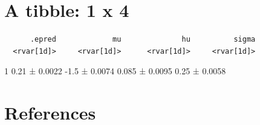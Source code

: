 \documentclass[
]{article}
\begin{document}
\section{A tibble: 1 x 4}\label{a-tibble-1-x-4-1}

\begin{verbatim}
      .epred             mu              hu          sigma
  <rvar[1d]>     <rvar[1d]>      <rvar[1d]>     <rvar[1d]>
\end{verbatim}

1 0.21 ± 0.0022 -1.5 ± 0.0074 0.085 ± 0.0095 0.25 ± 0.0058

\section*{References}\label{references}

\renewcommand{\bibsection}{}

\end{document}
